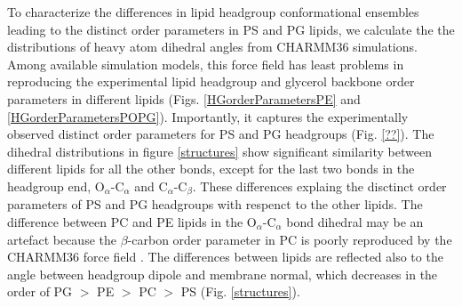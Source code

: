 \documentclass[aps,prl,superscriptaddress,twocolumn]{revtex4}
\begin{document}

To characterize the differences in lipid headgroup conformational ensembles
leading to the distinct order parameters in PS and PG lipids, we calculate the
the distributions of heavy atom dihedral angles from CHARMM36 simulations.
Among available simulation models, this force field has least problems in
reproducing the experimental lipid headgroup and glycerol backbone order parameters in different
lipids \cite{botan15,antila19} (Figs. \ref{HGorderParametersPE} and \ref{HGorderParametersPOPG}).
Importantly, it captures the experimentally observed distinct order parameters for PS and PG headgroups (Fig. \ref{??}).
The dihedral distributions in figure \ref{structures} show significant similarity between different lipids for all the other
bonds, except for the last two bonds in the headgroup end, O$_\alpha$-C$_\alpha$ and  C$_\alpha$-C$_\beta$.
These differences explaing the disctinct order parameters of
PS and PG headgroups with respenct to the other lipids.
The difference between PC and PE lipids in the O$_\alpha$-C$_\alpha$ bond dihedral
may be an artefact because the $\beta$-carbon order parameter in PC is poorly reproduced by the CHARMM36 force field \cite{botan15}.
The differences between lipids are reflected also to the 
angle between headgroup dipole and membrane normal,
which decreases in the order of PG $>$ PE  $>$ PC  $>$ PS (Fig. \ref{structures}). 
\end{document}
